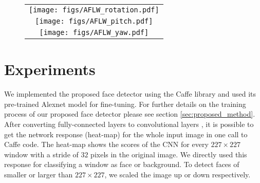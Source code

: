 \documentclass{sig-alternate-2013}
\begin{document}
\begin{figure}[t]
  \centering
	\begin{tabular}{c}
    	\texttt{[image: figs/AFLW\_rotation.pdf]} \\
    	\texttt{[image: figs/AFLW\_pitch.pdf]} \\
    	\texttt{[image: figs/AFLW\_yaw.pdf]} \\
    \end{tabular}
  \caption{}
  \label{fig:aflw_example_hist}
\end{figure}



\section{Experiments}

We implemented the proposed face detector using the Caffe library \cite{caffe} and used its pre-trained Alexnet \cite{alex-net} model for fine-tuning. For further details on the training process of our proposed face detector please see section \ref{sec:proposed_method}. After converting fully-connected layers to convolutional layers \cite{densenet}, it is possible to get the network response (heat-map) for the whole input image in one call to Caffe code.  The heat-map shows the scores of the CNN for every $227 \times 227$ window with a stride of $32$ pixels in the original image. We directly used this response for classifying a window as face or background. To detect faces of smaller or larger than $227 \times 227$, we scaled the image up or down respectively.
   
\end{document}
